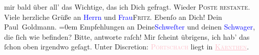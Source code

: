                mir bald über all’ das Wichtige, das ich Dich gefragt. Wieder \textsc{Poste restante}.\pend
           \pstart
           {\pb}Viele herzliche Grüße an \textcolor{blue}{Herrn}{} und \textcolor{blue}{Frau}{}\ledrightnote{\textcolor{blue}{Adele Kapper}}{ }\textsc{Fritz}. Ebenſo an Dich!\pend
           \pstart
           Dein {\\[\baselineskip]}\spacefill\mbox{Paul Goldmann.}\pend
           \leftskip=0em{}\pstart
           \noindent{}Empfehlungen an Deine\strikeout{\textcolor{gray}{n}}{ }\textcolor{blue}{Schweſter}{} und deinen \textcolor{blue}{Schwager}{}, die ſich wie
                  befinden?\pend
           \pstart
           Bitte, antworte raſch! Mir ſcheint übrigens, ich hab’ das ſchon oben irgendwo
                  geſagt.\pend
           \pstart
           Unter Discretion: \textsc{\textcolor{pink}{Pörtschach}{}\ledrightnote{\textcolor{pink}{Pörtschach}}} liegt in \textsc{\textcolor{pink}{\uline{Kärnthen}}{}\ledrightnote{\textcolor{pink}{Kärnten}}}.\pend
           \endnumbering{}  
      